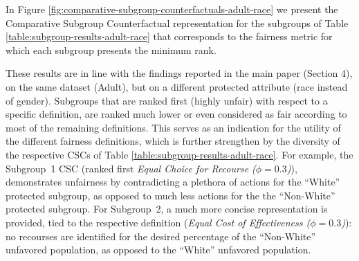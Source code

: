 \documentclass{article}
\begin{document}
In Figure \ref{fig:comparative-subgroup-counterfactuals-adult-race} we present the  
Comparative Subgroup Counterfactual representation for the subgroups of Table \ref{table:subgroup-results-adult-race}
that corresponds to the fairness metric for which each subgroup presents the minimum rank.

These results are in line with the findings reported in the main paper (Section 4), on the same dataset (Adult), but on a different protected attribute (race instead of gender). Subgroups that are ranked first (highly unfair) with respect to a specific definition, are ranked much lower or even considered as fair according to most of the remaining definitions. This serves as an indication for the utility of the different fairness definitions, which is further strengthen by the diversity of the respective CSCs of Table \ref{table:subgroup-results-adult-race}. For example, the Subgroup~1 CSC (ranked first \textit{Equal Choice for Recourse ($\phi=0.3$)}), demonstrates unfairness by contradicting a plethora of actions for the ``White'' protected subgroup, as opposed to much less actions for the the ``Non-White'' protected subgroup. For Subgroup~2, a much more concise representation is provided, tied to the respective definition (\textit{Equal Cost of Effectiveness ($\phi=0.3$)}): no recourses are identified for the desired percentage of the ``Non-White'' unfavored population, as opposed to the ``White'' unfavored population.
\end{document}
